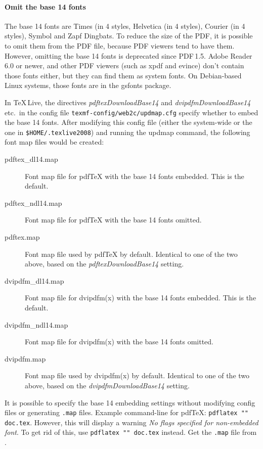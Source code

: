 \documentclass{ltugproc}
\def\cmd{\textsf}
\def\pkg{\textsf}
\begin{document}
\paragraph{Omit the base 14 fonts} The base 14 fonts are Times (in 4 styles,
Helvetica (in 4 styles), Courier (in 4 styles), Symbol and Zapf Dingbats.
To reduce the size of the PDF, it is possible to omit them from the
PDF file, because PDF viewers tend to have them. However, omitting the base 14
fonts is deprecated since PDF\,1.5. Adobe Reader 6.0 or newer,
and other PDF viewers (such as \cmd{xpdf} and \cmd{evince}) don't contain
those fonts either, but they can find them as system fonts. On Debian-based
Linux systems, those fonts are in the \pkg{gsfonts} package.

In \TeX\,Live, the directives \emph{pdftexDownloadBase14} and
\emph{dvipdfmDownloadBase14} etc.\ in the config file
\texttt{texmf-config/web2c/updmap.cfg} specify whether to embed the base 14
fonts. After modifying this config file (either the system-wide or the one in
\texttt{\$HOME/.texlive2008}) and running the \cmd{updmap} command, the
following font map files would be created:

\begin{description}

\item[pdftex\_dl14.map] Font map file for pdf\TeX{} with the base 14 fonts
  embedded. This is the default.
\item[pdftex\_ndl14.map] Font map file for pdf\TeX{} with the base 14 fonts
  omitted.
\item[pdftex.map] Font map file used by pdf\TeX{} by default.
Identical to one of the two above, based on the
\emph{pdftexDownloadBase14} setting.
\item[dvipdfm\_dl14.map] Font map file for \cmd{dvipdfm(x)} with the base 14
  fonts embedded. This is the default.
\item[dvipdfm\_ndl14.map] Font map file for \cmd{dvipdfm(x)} with the base 14
  fonts omitted.
\item[dvipdfm.map] Font map file used by \cmd{dvipdfm(x)} by default.
Identical to one of the two above, based on the
\emph{dvipdfmDownloadBase14} setting.

\end{description}

It is possible to specify the base 14 embedding settings without modifying
config files or generating \texttt{.map} files. Example command-line for
pdf\TeX{}: \texttt{pdflatex "\string{}\string"
doc.tex}.
However, this will display a warning \emph{No flags specified for
non-embedded font}. To get rid of this, use
\texttt{pdflatex "\string{}\string"
doc.tex}
instead. Get the \texttt{.map} file from \cite{pdfsizeopt-extra}.
\end{document}
